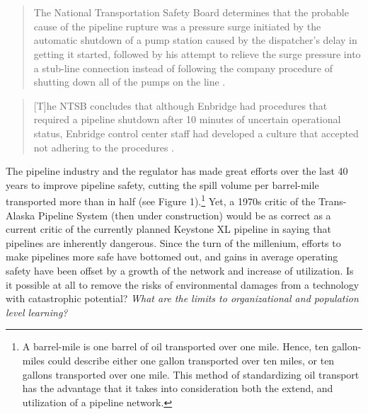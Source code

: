 \section{}

\begin{quote}
	The National Transportation Safety Board determines that the probable cause of the pipeline rupture was a pressure surge initiated by the automatic shutdown of a pump station caused by the dispatcher's delay in getting it started, followed by his attempt to relieve the surge pressure into a stub-line connection instead of following the company procedure of shutting down all of the pumps on the line \citep{NTSB1981}.
\end{quote}

\begin{quote}
	[T]he NTSB concludes that although Enbridge had procedures that required a pipeline shutdown after 10 minutes of uncertain operational status, Enbridge control center staff had developed a culture that accepted not adhering to the procedures \citep{NTSB2012}.
\end{quote}

The pipeline industry and the regulator has made great efforts over the last 40 years to improve pipeline safety, cutting the spill volume per barrel-mile transported more than in half (see Figure 1).\footnote{A barrel-mile is one barrel of oil transported over one mile. Hence, ten gallon-miles could describe either one gallon transported over ten miles, or ten gallons transported over one mile. This method of standardizing oil transport has the advantage that it takes into consideration both the extend, and utilization of a pipeline network.} Yet, a 1970s critic of the Trans-Alaska Pipeline System (then under construction) would be as correct as a current critic of the currently planned Keystone XL pipeline in saying that pipelines are inherently dangerous. Since the turn of the millenium, efforts to make pipelines more safe have bottomed out, and gains in average operating safety have been offset by a growth of the network and increase of utilization. Is it possible at all to remove the risks of environmental damages from a technology with catastrophic potential? \textit{What are the limits to organizational and population level learning?}

